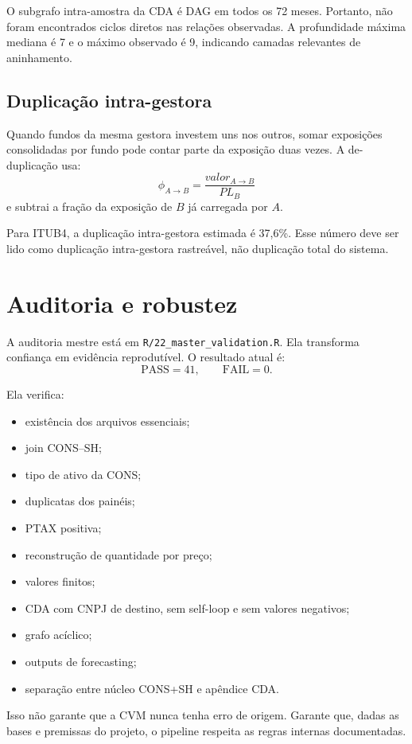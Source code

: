 \documentclass[11pt,a4paper]{article}
\begin{document}
O subgrafo intra-amostra da CDA é DAG em todos os 72 meses. Portanto, não foram encontrados ciclos diretos
nas relações observadas. A profundidade máxima mediana é 7 e o máximo observado é 9, indicando camadas
relevantes de aninhamento.

\subsection{Duplicação intra-gestora}

Quando fundos da mesma gestora investem uns nos outros, somar exposições consolidadas por fundo pode contar
parte da exposição duas vezes. A de-duplicação usa:
\[
\phi_{A\to B}=\frac{valor_{A\to B}}{PL_B}
\]
e subtrai a fração da exposição de $B$ já carregada por $A$.

Para ITUB4, a duplicação intra-gestora estimada é 37,6\%. Esse número deve ser lido como duplicação
intra-gestora rastreável, não duplicação total do sistema.

\section{Auditoria e robustez}

A auditoria mestre está em \texttt{R/22\_master\_validation.R}. Ela transforma confiança em evidência
reprodutível. O resultado atual é:
\[
\text{PASS}=41,\qquad \text{FAIL}=0.
\]

Ela verifica:
\begin{itemize}
\item existência dos arquivos essenciais;
\item join CONS--SH;
\item tipo de ativo da CONS;
\item duplicatas dos painéis;
\item PTAX positiva;
\item reconstrução de quantidade por preço;
\item valores finitos;
\item CDA com CNPJ de destino, sem self-loop e sem valores negativos;
\item grafo acíclico;
\item outputs de forecasting;
\item separação entre núcleo CONS+SH e apêndice CDA.
\end{itemize}

Isso não garante que a CVM nunca tenha erro de origem. Garante que, dadas as bases e premissas do projeto, o
pipeline respeita as regras internas documentadas.
\end{document}
